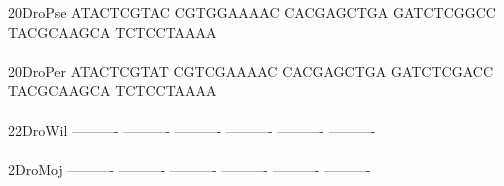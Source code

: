 \documentclass[11pt,twoside,reqno,a4paper]{article}
\begin{document}
{20\hspace*{3\charwidth}DroPse	ATACTCGTAC	CGTGGAAAAC	CACGAGCTGA	GATCTCGGCC	TACGCAAGCA	TCTCCTAAAA	\\
\hspace*{5\charwidth}\hspace*{7\charwidth}\hspace*{1\charwidth}\hspace*{1\charwidth}\hspace*{1\charwidth}\hspace*{1\charwidth}\hspace*{1\charwidth}\hspace*{1\charwidth}\\
20\hspace*{3\charwidth}DroPer	ATACTCGTAT	CGTCGAAAAC	CACGAGCTGA	GATCTCGACC	TACGCAAGCA	TCTCCTAAAA	\\
\hspace*{5\charwidth}\hspace*{7\charwidth}\hspace*{1\charwidth}\hspace*{1\charwidth}\hspace*{1\charwidth}\hspace*{1\charwidth}\hspace*{1\charwidth}\hspace*{1\charwidth}\\
22\hspace*{3\charwidth}DroWil	----------	----------	----------	----------	----------	----------	\\
\hspace*{5\charwidth}\hspace*{7\charwidth}\hspace*{1\charwidth}\hspace*{1\charwidth}\hspace*{1\charwidth}\hspace*{1\charwidth}\hspace*{1\charwidth}\hspace*{1\charwidth}\\
2\hspace*{4\charwidth}DroMoj	----------	----------	----------	----------	----------	----------	\\
\hspace*{5\charwidth}\hspace*{7\charwidth}\hspace*{1\charwidth}\hspace*{1\charwidth}\hspace*{1\charwidth}\hspace*{1\charwidth}\hspace*{1\charwidth}\hspace*{1\charwidth}\\
}
\end{document}
